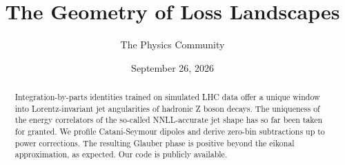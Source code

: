 \documentclass[11pt]{article}
\title{The Geometry of Loss Landscapes}
\author{The Physics Community}
\date{September 26, 2026}
\begin{document}
\maketitle
\begin{abstract}
Integration-by-parts identities trained on simulated LHC data offer a
unique window into Lorentz-invariant jet angularities of hadronic Z
boson decays. The uniqueness of the energy correlators of the so-called
NNLL-accurate jet shape has so far been taken for granted. We profile
Catani-Seymour dipoles and derive zero-bin subtractions up to power
corrections. The resulting Glauber phase is positive beyond the eikonal
approximation, as expected. Our code is publicly available.
\end{abstract}
\tableofcontents






\nocite{*}


\end{document}
